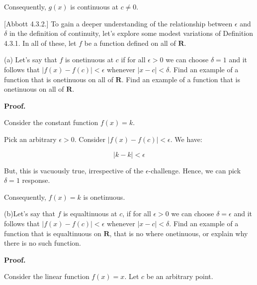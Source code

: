 \documentclass[10pt]{article}
\begin{document}
Consequently, $\displaystyle g( x)$ is continuous at $\displaystyle c\neq 0$.



[Abbott 4.3.2.] To gain a deeper understanding of the relationship between $\displaystyle \epsilon $ and $\displaystyle \delta $ in the definition of continuity, let's explore some modest variations of Definition 4.3.1. In all of these, let $\displaystyle f$ be a function defined on all of $\displaystyle \mathbf{R}$.



(a) Let's say that $\displaystyle f$ is onetinuous at $\displaystyle c$ if for all $\displaystyle \epsilon  >0$ we can choose $\displaystyle \delta =1$ and it follows that $\displaystyle |f( x) -f( c) |< \epsilon $ whenever $\displaystyle |x-c|< \delta $. Find an example of a function that is onetinuous on all of $\displaystyle \mathbf{R}$. Find an example of a function that is onetinuous on all of $\displaystyle \mathbf{R}$.



\textbf{Proof.}



Consider the constant function $\displaystyle f( x) =k$. 



Pick an arbitrary $\displaystyle \epsilon  >0$. Consider $\displaystyle |f( x) -f( c) |< \epsilon $. We have:


\begin{equation*}
|k-k|< \epsilon 
\end{equation*}


But, this is vacuously true, irrespective of the $\displaystyle \epsilon $-challenge. Hence, we can pick $\displaystyle \delta =1$ response.



Consequently, $\displaystyle f( x) =k$ is onetinuous.



(b)Let's say that $\displaystyle f$ is equaltinuous at $\displaystyle c$, if for all $\displaystyle \epsilon  >0$ we can choose $\displaystyle \delta =\epsilon $ and it follows that $\displaystyle |f( x) -f( c) |< \epsilon $ whenever $\displaystyle |x-c|< \delta $. Find an example of a function that is equaltinuous on $\displaystyle \mathbf{R}$, that is no where onetinuous, or explain why there is no such function.



\textbf{Proof.}

Consider the linear function $\displaystyle f( x) =x$. Let $\displaystyle c$ be an arbitrary point. 
\end{document}
